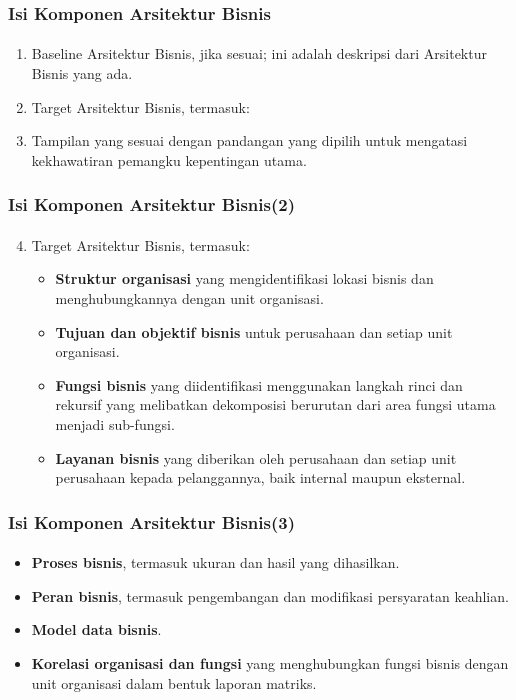 \documentclass[aspectratio=169, table]{beamer}
\begin{document}
	\begin{frame}
		\frametitle{Isi Komponen Arsitektur Bisnis}
		\framesubtitle{\hspace{1cm}}
		\begin{enumerate}
			\item Baseline Arsitektur Bisnis, jika sesuai; ini adalah deskripsi dari Arsitektur Bisnis yang ada.
			\item Target Arsitektur Bisnis, termasuk:
			\item Tampilan yang sesuai dengan pandangan yang dipilih untuk mengatasi kekhawatiran pemangku kepentingan utama.
		\end{enumerate}
	\end{frame}	
	
		\begin{frame}
		\frametitle{Isi Komponen Arsitektur Bisnis(2)}
		\framesubtitle{\hspace{1cm}}
		\begin{enumerate}
			\setcounter{enumi}{3}
			\item Target Arsitektur Bisnis, termasuk:
			\begin{itemize}
				\item \textbf{Struktur organisasi} yang mengidentifikasi lokasi bisnis dan menghubungkannya dengan unit organisasi.
				\item \textbf{Tujuan dan objektif bisnis} untuk perusahaan dan setiap unit organisasi.
				\item \textbf{Fungsi bisnis} yang diidentifikasi menggunakan langkah rinci dan rekursif yang melibatkan dekomposisi berurutan dari area fungsi utama menjadi sub-fungsi.
				\item \textbf{Layanan bisnis} yang diberikan oleh perusahaan dan setiap unit perusahaan kepada pelanggannya, baik internal maupun eksternal.
			\end{itemize}
		\end{enumerate}
	\end{frame}	
	
	
	\begin{frame}
		\frametitle{Isi Komponen Arsitektur Bisnis(3)}
		\framesubtitle{\hspace{1cm}}
		\begin{itemize}
		
			\begin{itemize}
				\item \textbf{Proses bisnis}, termasuk ukuran dan hasil yang dihasilkan.
				\item \textbf{Peran bisnis}, termasuk pengembangan dan modifikasi persyaratan keahlian.
				\item \textbf{Model data bisnis}.
				\item \textbf{Korelasi organisasi dan fungsi} yang menghubungkan fungsi bisnis dengan unit organisasi dalam bentuk laporan matriks.
			\end{itemize}
			\end{itemize}
	\end{frame}
	
\end{document}

